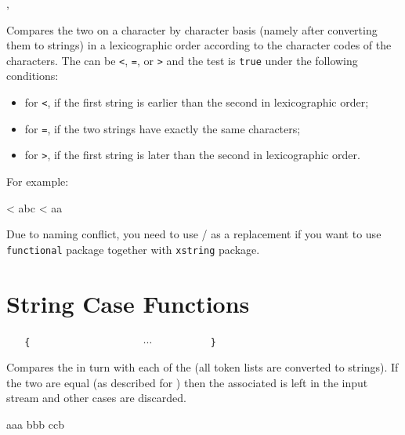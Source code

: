 \documentclass[oneside]{book}
\begin{document}
\begin{function}{\StrCompare,\StrCompareTF}
\begin{syntax}
   
     
\end{syntax}
Compares the two  on a character by character
basis (namely after converting them to strings) in a lexicographic
order according to the character codes of the characters.  The
 can be \verb|<|, \verb|=|, or \verb|>| and the test is
\texttt{true} under the following conditions:
\begin{itemize}[nosep]
\item for \verb|<|, if the first string is earlier than the second in lexicographic order;
\item for \verb|=|, if the two strings have exactly the same characters;
\item for \verb|>|, if the first string is later than the second in lexicographic order.
\end{itemize}
For example:
\begin{demohigh}
 < {abc} {} {}
 < {aa} {} {}
\end{demohigh}
\par
Due to naming conflict, you need to use / as a replacement
if you want to use \verb!functional! package together with \verb!xstring! package.
\end{function}

\section{String Case Functions}

\begin{function}{\StrCase}
\begin{syntax}
 
~ ~ \verb|{|
~ ~ ~ ~  
~ ~ ~ ~  
~ ~ ~ ~ $\cdots$
~ ~ ~ ~  
~ ~ \verb|}|
\end{syntax}
Compares the  in turn with each
of the  (all token lists are converted to strings).
If the two are equal (as described for
) then the associated  is left in the
input stream and other cases are discarded.
\begin{demohigh}
\IgnoreSpacesOn
{} {
  {aaa} {}
  {bbb} {}
  {ccb} {}
}
\IgnoreSpacesOff
\end{demohigh}
\end{function}
\end{document}
